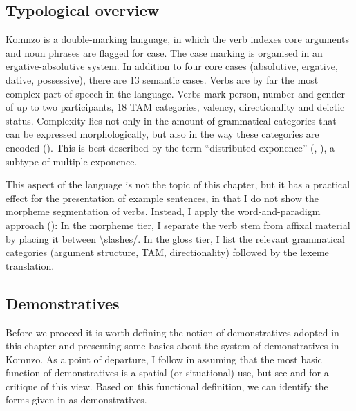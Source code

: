 \documentclass[output=paper,colorlinks,citecolor=brown]{langscibook}
\begin{document}
\subsection{Typological overview}\label{sec:doehler:typo}

Komnzo is a double-marking language, in which the verb indexes core arguments and noun phrases are flagged for case. The case marking is organised in an ergative-absolutive system. In addition to four core cases (absolutive, ergative, dative, possessive), there are 13 semantic cases. Verbs are by far the most complex part of speech in the language. Verbs mark person, number and gender of up to two participants, 18 TAM categories, valency, directionality and deictic status. Complexity lies not only in the amount of grammatical categories that can be expressed morphologically, but also in the way these categories are encoded (\cite[175ff.]{Dohler:2018qt}). This is best described by the term ``distributed exponence'' (\cite{Caballero:2012fq}, \cite{Carroll:2016bf}), a subtype of multiple exponence.

This aspect of the language is not the topic of this chapter, but it has a practical effect for the presentation of example sentences, in that I do not show the morpheme segmentation of verbs. Instead, I apply the word-and-paradigm approach (\cite{Matthews:1974yw}): In the morpheme tier, I separate the verb stem from affixal material by placing it between \textbackslash slashes/. In the gloss tier, I list the relevant grammatical categories (argument structure, TAM, directionality) followed by the lexeme translation.

\subsection{Demonstratives}\label{sec:doehler:demonstratives}

Before we proceed it is worth defining the notion of demonstratives adopted in this chapter and presenting some basics about the system of demonstratives in Komnzo. As a point of departure, I follow \textcite[2ff.]{Diessel:1999yp} in assuming that the most basic function of demonstratives is a spatial (or situational) use, but see \textcite{Himmelmann:1996sn} and \textcite{De-Mulder:1996gd} for a critique of this view. Based on this functional definition, we can identify the forms given in  as demonstratives.
\end{document}
